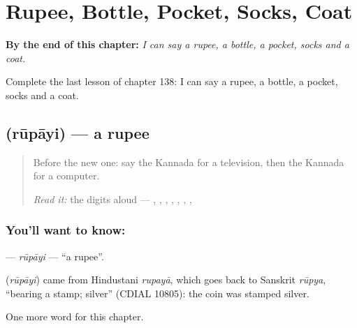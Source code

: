 
\chapter{Rupee, Bottle, Pocket, Socks, Coat}
\label{ch:ka-rupee-bottle-pocket-socks-coat}

\begin{chapteropening}
\textbf{By the end of this chapter:} \emph{I can say a rupee, a bottle, a pocket, socks and a coat.}

Complete the last lesson of chapter 138: I can say a rupee, a bottle, a pocket, socks and a coat.
\end{chapteropening}

\section[\texorpdfstring{\kn{ರೂಪಾಯಿ} (rūpāyi)}{ರೂಪಾಯಿ (rūpāyi)}]{ (rūpāyi) — a rupee}

\label{lesson:KA-C138-rupayi}



\begin{quote}
Before the new one: say the Kannada for a television, then the Kannada for a computer.

\emph{Read it:} the digits aloud — \textbf{}, \textbf{}, \textbf{}, \textbf{}, \textbf{}, \textbf{}, \textbf{}, \textbf{}
\end{quote}

\subsection*{You'll want to know: }
\textbf{} — \emph{rūpāyi} — \textquotedblleft{}a rupee\textquotedblright{}.

\begin{cousinweb}
\textbf{} (\emph{rūpāyi}) came from Hindustani \emph{rupayā}, which goes back to Sanskrit \emph{rūpya}, \textquotedblleft{}bearing a stamp; silver\textquotedblright{} (CDIAL 10805): the coin was stamped silver.
\end{cousinweb}

\begin{grammarlens}[title={What you've built}]
One more word for this chapter.
\end{grammarlens}

